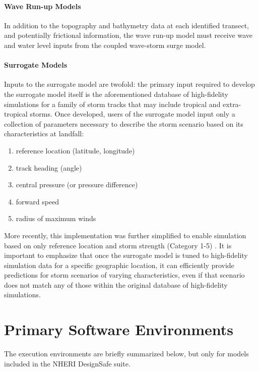 \paragraph{Wave Run-up Models} In addition to the topography and bathymetry data at each identified transect, and potentially frictional information, the wave run-up model must receive wave and water level inputs from the coupled wave-storm surge model.

\paragraph{Surrogate Models} Inputs to the surrogate model are twofold: the primary input required to develop the surrogate model itself is the aforementioned database of high-fidelity simulations for a family of storm tracks that may include tropical and extra-tropical storms. Once developed, users of the surrogate model input only a collection of parameters necessary to describe the storm scenario based on its characteristics at landfall: 

\begin{enumerate}
    \item reference location (latitude, longitude)
    \item track heading (angle)
    \item central pressure (or pressure difference)
    \item forward speed
    \item radius of maximum winds
\end{enumerate}

More recently, this implementation was further simplified to enable simulation based on only reference location and storm strength (Category 1-5) \citep{njcoast2018implementation}. It is important to emphasize that once the surrogate model is tuned to high-fidelity simulation data for a specific geographic location, it can efficiently provide predictions for storm scenarios of varying characteristics, even if that scenario does not match any of those within the original database of high-fidelity simulations. 

\section{Primary Software Environments}
\label{sec:storm_surge_tools}

The execution environments are briefly summarized below, but only for models included in the NHERI DesignSafe suite. 

